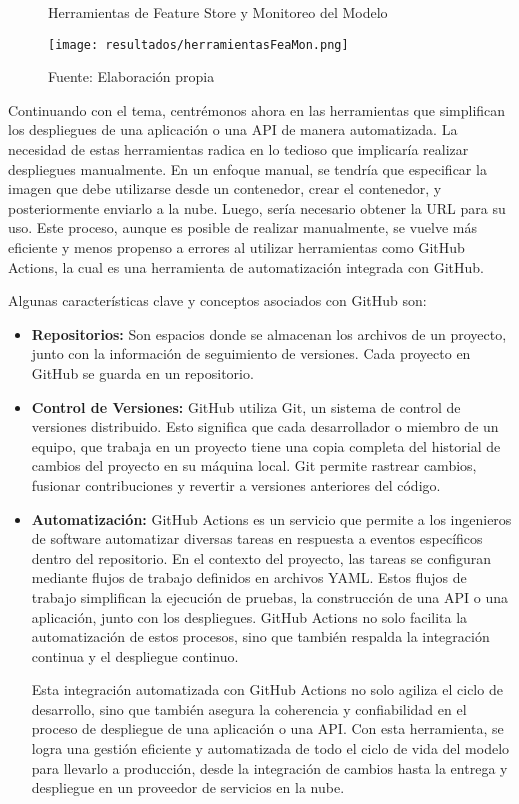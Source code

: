 \newpage

\begin{figure}[h]
	\centering
	\caption{Herramientas de Feature Store y Monitoreo del Modelo}
	\texttt{[image: resultados/herramientasFeaMon.png]}
	\caption*{\footnotesize Fuente: Elaboración propia}
	\label{fig:figuraHerramientasFeaMon}
\end{figure}

Continuando con el tema, centrémonos ahora en las herramientas que simplifican los despliegues de una aplicación o una API de manera automatizada. La necesidad de estas herramientas radica en lo tedioso que implicaría realizar despliegues manualmente. En un enfoque manual, se tendría que especificar la imagen que debe utilizarse desde un contenedor, crear el contenedor, y posteriormente enviarlo a la nube. Luego, sería necesario obtener la URL para su uso. Este proceso, aunque es posible de realizar manualmente, se vuelve más eficiente y menos propenso a errores al utilizar herramientas como GitHub Actions, la cual es una herramienta de automatización integrada con GitHub.

Algunas características clave y conceptos asociados con GitHub son:

\begin{itemize}
	\item \textbf{Repositorios:} Son espacios donde se almacenan los archivos de un proyecto,  junto  con  la  información  de  seguimiento  de  versiones.  Cada  proyecto  en GitHub se guarda en un repositorio.
	\item \textbf{Control de Versiones:} GitHub utiliza Git, un sistema de control de versiones distribuido. Esto significa que cada desarrollador o miembro de un equipo, que trabaja en un proyecto tiene una copia completa del historial de cambios del proyecto en su  máquina  local.  Git  permite  rastrear  cambios,  fusionar  contribuciones  y  revertir  a versiones anteriores del código.
	\item \textbf{Automatización:} GitHub Actions es un servicio que permite a los ingenieros de software automatizar diversas tareas en respuesta a eventos específicos dentro del repositorio. En el contexto del proyecto, las tareas se configuran mediante flujos de trabajo definidos en archivos YAML. Estos flujos de trabajo simplifican la ejecución de pruebas, la construcción de una API o una aplicación, junto con los despliegues. GitHub Actions no solo facilita la automatización de estos procesos, sino que también respalda la integración continua y el despliegue continuo.
	
	Esta integración automatizada con GitHub Actions no solo agiliza el ciclo de desarrollo, sino que también asegura la coherencia y confiabilidad en el proceso de despliegue de una aplicación o una API. Con esta herramienta, se logra una gestión eficiente y automatizada de todo el ciclo de vida del modelo para llevarlo a producción, desde la integración de cambios hasta la entrega y despliegue en un proveedor de servicios en la nube.
\end{itemize}

